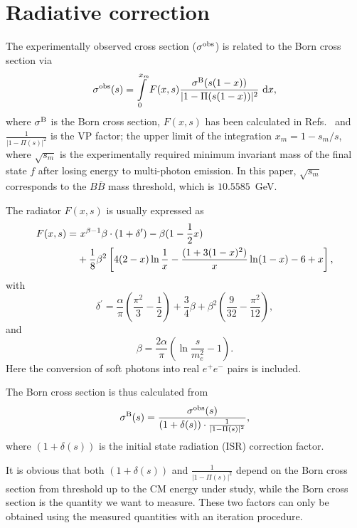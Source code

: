 \documentclass[aps,showpacs,superscriptaddress,preprint,tightenlines]{revtex4}
\newcommand{\EE}{e^+e^-}
\newcommand{\rhos}{(1+\delta(s))}
\begin{document}
\section{Radiative correction}

The experimentally observed cross section ($\sigma^{\rm obs}$) is
related to the Born cross section via
\begin{equation}
\sigma^{\rm obs} (s)=\int \limits_{0}^{x_m} F(x,s)
\frac{\sigma^{\rm B}(s(1-x))}{|1-\Pi (s(1-x))|^2} \ \mathrm{d}x ,
\label{radsec}
\end{equation}
where $\sigma^{\rm B}$ is the Born cross section, $F(x,s)$ has
been calculated in Refs.~\cite{rad,Berends,ref-ask-2-mont} and $\frac{1}{|1-\Pi(s)|^2}$ 
is the VP factor; the upper limit of the integration
$x_m=1-s_m/s$, where $\sqrt{s_m}$ is the experimentally required
minimum invariant mass of the final state $f$ after losing energy
to multi-photon emission. In this paper, $\sqrt{s_m}$ corresponds
to the $B\bar{B}$ mass threshold, which is $10.5585$~GeV.

The radiator $F(x,s)$ is usually expressed as~\cite{rad}
\begin{align}
F(x,s) =&\ x^{\beta-1}\beta \cdot ( 1+\delta^\prime )
-\beta(1-\frac{1}{2}x)\notag\\
&+\frac{1}{8}\beta^2
\left[4(2-x)\ln\frac{1}{x}-\frac{(1+3(1-x)^2)}{x}\ln(1-x)-6+x\right],
\label{FKuraev}
\end{align}
with
\begin{equation}
\delta^\prime=\frac{\alpha}{\pi} (\frac{\pi^2}{3} - \frac{1}{2})+
\frac{3}{4} \beta + \beta^2(\frac{9}{32}-\frac{\pi^2}{12}),
\label{defdelta}
\end{equation}
and
\begin{equation}
\beta = \frac{2 \alpha}{\pi} \left( \ln \frac{s}{m^2_e} -1
\right). \label{defoft}
\end{equation}
Here the conversion of soft photons into real $\EE$ pairs is
included.

The Born cross section is thus calculated from
\begin{equation}\label{formula-cs}
\sigma^{\rm B}(s)=\frac{\sigma^{\rm obs}(s)}
 {\rhos \cdot \frac{1}{|1-\Pi(s)|^{2}}},
\end{equation}
where $\rhos$ is the initial state radiation (ISR) correction
factor.

It is obvious that both $\rhos$ and $\frac{1}{|1-\Pi(s)|^{2}}$ depend on the
Born cross section from threshold up to the CM energy under study,
while the Born cross section is the quantity we want to measure. These two
factors can only be obtained using the measured quantities with an
iteration procedure.
\end{document}
